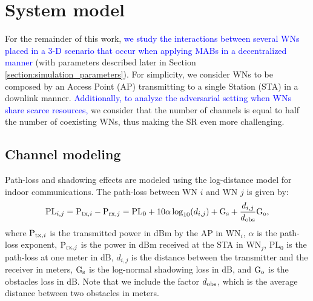 \documentclass[preprint,12pt]{elsarticle}
\newcommand{\francesc}[1]{\textcolor{blue}{#1}}
\begin{document}
\section{System model}
\label{section:system_model}	

For the remainder of this work, \francesc{we study the interactions between several WNs placed in a 3-D scenario that occur when applying MABs in a decentralized manner} (with parameters described later in Section \ref{section:simulation_parameters}). For simplicity, we consider WNs to be composed by an Access Point (AP) transmitting to a single Station (STA) in a downlink manner. \francesc{Additionally, to analyze the adversarial setting when WNs share scarce resources,} we consider that the number of channels is equal to half the number of coexisting WNs, thus making the SR even more challenging. 

\subsection{Channel modeling}
\label{section:channel_modelling}		
Path-loss and shadowing effects are modeled using the log-distance model for indoor communications. The path-loss between WN $i$ and WN $j$ is given by:	
\begin{equation}
\text{PL}_{i,j} = \text{P}_{{\rm tx},i} - \text{P}_{{\rm rx},j} = \text{PL}_0 + 10  \alpha  \log_{10}(d_{i,j}) + \text{G}_{{\rm s}} + \frac{d_{i,j}}{d_{{\rm obs}}} \text{G}_{{\rm o}}, \nonumber
\nonumber
\end{equation}
where $\text{P}_{{\rm tx},i}$ is the transmitted power in dBm by the AP in $\text{WN}_i$, $\alpha$ is the path-loss exponent, $\text{P}_{{\rm rx},j}$ is the power in dBm received at the STA in $\text{WN}_j$, $\text{PL}_0$ is the path-loss at one meter in dB, $d_{i,j}$ is the distance between the transmitter and the receiver in meters, $\text{G}_{{\rm s}}$ is the log-normal shadowing loss in dB, and $\text{G}_{{\rm o}}$ is the obstacles loss in dB. Note that we include the factor $d_{{\rm obs}}$, which is the average distance between two obstacles in meters. 

\end{document}
